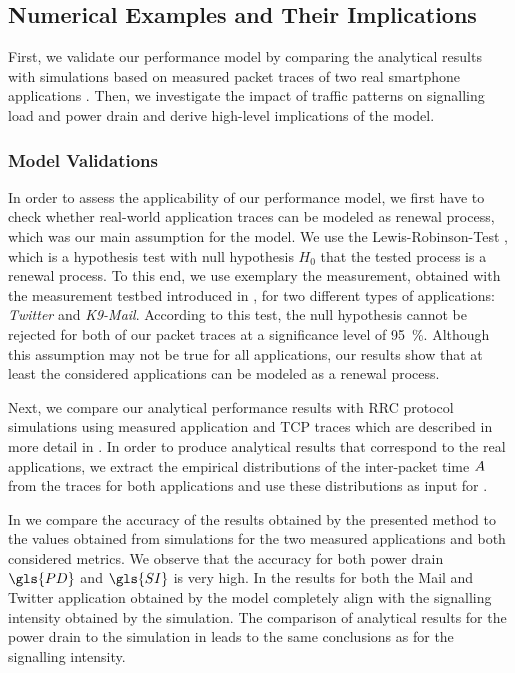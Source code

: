 \subsection{Numerical Examples and Their Implications}\label{sec:network:performance_model:numerical_examples}
First, we validate our performance model by comparing the analytical results with simulations based on measured
packet traces of two real smartphone applications .
Then, we investigate the impact of traffic patterns on signalling load and power drain and derive high-level implications of the model.

\subsubsection*{Model Validations}\label{sec:network:performance_model:validations}

In order to assess the applicability of our performance model, we first have to check whether real-world application traces can be modeled as renewal process, which was our main assumption for the model.
We use the Lewis-Robinson-Test \cite{Ascher1984}, which is a hypothesis test with null hypothesis \(H_0\) that the tested process is a renewal process.
To this end, we use exemplary the measurement, obtained with the measurement testbed introduced in , for two different types of applications: \emph{Twitter} and \emph{K9-Mail}.
According to this test, the null hypothesis cannot be rejected for both of our packet traces at a significance level of \SI{95}{\percent}.
Although this assumption may not be true for all applications, our results show that at least the considered applications can be modeled as a renewal process.

Next, we compare our analytical performance results with \gls{RRC} protocol simulations using measured application and \gls{TCP} traces which are described in more detail in .
In order to produce analytical results that correspond to the real applications, we extract the empirical distributions of the inter-packet time \(A\) from the traces for both applications and use these distributions as input for . 

In  we compare the accuracy of the results  obtained by the presented method to the values obtained from simulations for the two measured applications and both considered metrics.
We observe that the accuracy for both power drain \(\gls{PD}\) and \(\gls{SI}\) is very high.
In  the results for both the Mail and Twitter application obtained by the model completely align with the signalling intensity obtained by the simulation.
The comparison of analytical results for the power drain to the simulation in  leads to the same conclusions as for the signalling intensity.

